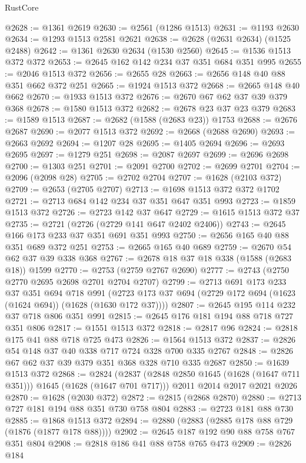\begin{lexlean}{RustCore}
\begin{coremodule}
@2628 := @1361 @2619
@2630 := @2561 (@1286 @1513)
@2631 := @1193 @2630
@2634 := @1293 @1513 @2581 @2621
@2638 := @2628 (@2631 @2634) (@1525 @2488)
@2642 := @1361 @2630 @2634 (@1530 @2560)
@2645 := @1536 @1513 @372 @372
@2653 := @2645 @162 @142 @234 @37 @351 @684 @351 @995
@2655 := @2046 @1513 @372
@2656 := @2655 @28
@2663 := @2656 @148 @40 @88 @351 @662 @372 @251
@2665 := @1924 @1513 @372
@2668 := @2665 @148 @40 @662
@2670 := @1933 @1513 @372
@2676 := @2670 @67 @62 @37 @39 @379 @368
@2678 := @1580 @1513 @372
@2682 := @2678 @23 @37 @23 @379
@2683 := @1589 @1513
@2687 := @2682 (@1588 (@2683 @23)) @1753
@2688 := @2676 @2687
@2690 := @2077 @1513 @372
@2692 := @2668 (@2688 @2690)
@2693 := @2663 @2692
@2694 := @1207 @28
@2695 := @1405 @2694
@2696 := @2693 @2695
@2697 := @1279 @251
@2698 := @2087 @2697
@2699 := @2696 @2698
@2700 := @1303 @251
@2701 := @2091 @2700
@2702 := @2699 @2701
@2704 := @2096 (@2098 @28)
@2705 := @2702 @2704
@2707 := @1628 (@2103 @372)
@2709 := @2653 (@2705 @2707)
@2713 := @1698 @1513 @372 @372 @1702
@2721 := @2713 @684 @142 @234 @37 @351 @647 @351 @993
@2723 := @1859 @1513 @372
@2726 := @2723 @142 @37 @647
@2729 := @1615 @1513 @372 @37
@2735 := @2721 (@2726 (@2729 @141 @647 @2402 @2406))
@2743 := @2645 @166 @173 @233 @37 @351 @691 @351 @993
@2750 := @2656 @165 @40 @88 @351 @689 @372 @251
@2753 := @2665 @165 @40 @689
@2759 := @2670 @54 @62 @37 @39 @338 @368
@2767 := @2678 @18 @37 @18 @338 (@1588 (@2683 @18)) @1599
@2770 := @2753 (@2759 @2767 @2690)
@2777 := @2743 (@2750 @2770 @2695 @2698 @2701 @2704 @2707)
@2799 := @2713
    @691
    @173
    @233
    @37
    @351
    @694
    @718
    @991
    (@2723 @173 @37 @694 (@2729 @172 @694 (@1623 (@1624 @694)) (@1628 (@1630 @172 @37))))
@2807 := @2645 @195 @114 @232 @37 @718 @806 @351 @991
@2815 := @2645 @176 @181 @194 @88 @718 @727 @351 @806
@2817 := @1551 @1513 @372
@2818 := @2817 @96
@2824 := @2818 @175 @41 @88 @718 @725 @473
@2826 := @1564 @1513 @372
@2837 := @2826 @54 @148 @37 @40 @338 @717 @724 @328 @700 @335 @2767
@2848 := @2826 @67 @62 @37 @39 @379 @351 @368 @328 @710 @335 @2687
@2850 := @1639 @1513 @372
@2868 := @2824
    (@2837 (@2848 @2850 @1645 (@1628 (@1647 @711 @351))) @1645 (@1628 (@1647 @701 @717)))
    @2011
    @2014
    @2017
    @2021
    @2026
@2870 := @1628 (@2030 @372)
@2872 := @2815 (@2868 @2870)
@2880 := @2713 @727 @181 @194 @88 @351 @730 @758 @804
@2883 := @2723 @181 @88 @730
@2885 := @1868 @1513 @372
@2894 := @2880 (@2883 (@2885 @178 @88 @729 (@1876 (@1877 @178 @88))))
@2902 := @2645 @187 @192 @90 @88 @758 @767 @351 @804
@2908 := @2818 @186 @41 @88 @758 @765 @473
@2909 := @2826 @184

\end{coremodule}
\end{lexlean}
